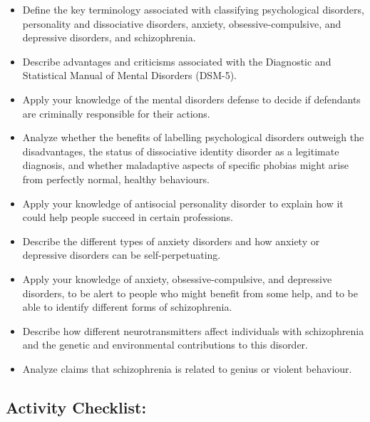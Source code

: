 \documentclass[
]{book}
\providecommand{\tightlist}{%
  \setlength{\itemsep}{0pt}\setlength{\parskip}{0pt}}
\begin{document}
\begin{itemize}
\tightlist
\item
  Define the key terminology associated with classifying psychological disorders, personality and dissociative disorders, anxiety, obsessive-compulsive, and depressive disorders, and schizophrenia.\\
\item
  Describe advantages and criticisms associated with the Diagnostic and Statistical Manual of Mental Disorders (DSM-5).\\
\item
  Apply your knowledge of the mental disorders defense to decide if defendants are criminally responsible for their actions.\\
\item
  Analyze whether the benefits of labelling psychological disorders outweigh the disadvantages, the status of dissociative identity disorder as a legitimate diagnosis, and whether maladaptive aspects of specific phobias might arise from perfectly normal, healthy behaviours.\\
\item
  Apply your knowledge of antisocial personality disorder to explain how it could help people succeed in certain professions.\\
\item
  Describe the different types of anxiety disorders and how anxiety or depressive disorders can be self-perpetuating.\\
\item
  Apply your knowledge of anxiety, obsessive-compulsive, and depressive disorders, to be alert to people who might benefit from some help, and to be able to identify different forms of schizophrenia.\\
\item
  Describe how different neurotransmitters affect individuals with schizophrenia and the genetic and environmental contributions to this disorder.
\item
  Analyze claims that schizophrenia is related to genius or violent behaviour.
\end{itemize}

\hypertarget{activity-checklist-9}{%
\subsection*{Activity Checklist:}\label{activity-checklist-9}}
\end{document}
